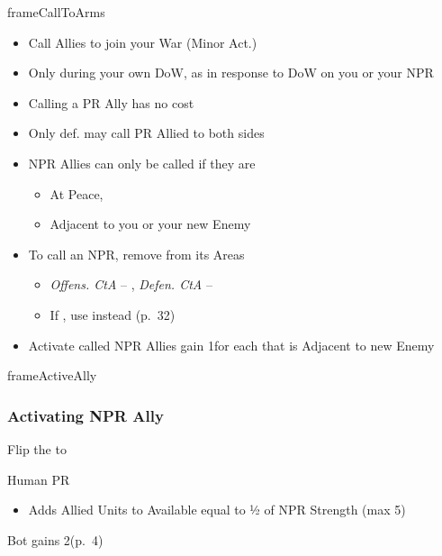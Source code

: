 \documentclass[10pt]{article}
\newlength{\fhActiveAlly} \setlength\fhActiveAlly{6\baselineskip}
\newlength{\fhCallToArms} \setlength\fhCallToArms{14\baselineskip}
\begin{document}
\begin{dynamiccontents*}{frameCallToArms}\begin{eubox}{\fhCallToArms}
	\begin{itemize}
		\item Call Allies to join your War (Minor Act.)
		\item Only during your own DoW,  as \reaction in response to DoW on you or your NPR \ally
		\item Calling a PR Ally has no cost
		\item Only def. may call PR Allied to both sides
		\item NPR Allies can only be called if they are
		\begin{itemize}
			\item At Peace, 
			\item Adjacent to you or your new Enemy
		\end{itemize}
		\item To call an NPR, remove \influence from its Areas
		\begin{itemize}
			\item \emph{Offens. CtA} -- \strong{2\influence}, \emph{Defen. CtA} -- \strong{1\influence}
			\item If , use \colonists instead (p.~32)
		\end{itemize}
		\item {}Activate called NPR Allies  gain 1\milpower for each that is Adjacent to new Enemy
	\end{itemize}
\end{eubox}\end{dynamiccontents*}

\begin{dynamiccontents*}{frameActiveAlly}\begin{eubox}{\fhActiveAlly}
	\subsubsection*{Activating NPR Ally }
	\begin{itemize}
		\item Flip the \alliance to \activeally
		\item Human PR
		\begin{itemize}
			\item Adds Allied Units to Available \manpower equal to ½ of NPR Strength (max 5)
			\end{itemize}
		{\botrules
		\item Bot gains 2\botpower (p.~4)
		}
	\end{itemize}
\end{eubox}\end{dynamiccontents*}
\end{document}
